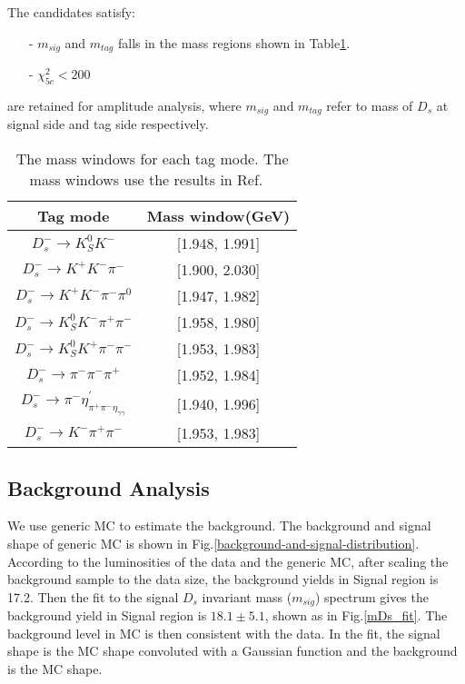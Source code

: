 {The candidates satisfy:
\begin{itemize}
    \item[-] $m_{sig}$ and $m_{tag}$ falls in the mass regions shown in Table\ref{ST-mass-window}. 
	\item[-] $\chi_{5c}^{2} < 200 $
\end{itemize}
are retained for amplitude analysis, where $m_{sig}$ and $m_{tag}$ refer to mass of $D_{s}$ at signal side and tag side respectively.
\begin{table}
    \caption{ The mass windows for each tag mode. The mass windows use the results in Ref. ~\cite{Doc-DB-630-v35} }
    \label{ST-mass-window}
    \begin{center}
        \begin{tabular}{cc}
            \toprule\toprule
            Tag mode & Mass window(GeV)  \\
            \hline
            $D_{s}^{-} \rightarrow K_{S}^{0}K^{-}$                          & [1.948, 1.991]    \\
            $D_{s}^{-} \rightarrow K^{+}K^{-}\pi^{-}$                       & [1.900, 2.030]    \\
            $D_{s}^{-} \rightarrow K^{+}K^{-}\pi^{-}\pi^{0}$                & [1.947, 1.982]    \\
            $D_{s}^{-} \rightarrow K_{S}^{0}K^{-}\pi^{+}\pi^{-}$            & [1.958, 1.980]    \\
            $D_{s}^{-} \rightarrow K_{S}^{0}K^{+}\pi^{-}\pi^{-}$            & [1.953, 1.983]    \\
            $D_{s}^{-} \rightarrow \pi^{-}\pi^{-}\pi^{+}$                   & [1.952, 1.984]    \\
            $D_{s}^{-} \rightarrow \pi^{-}\eta_{\pi^{+}\pi^{-}\eta_{\gamma\gamma}}^{'}$  & [1.940, 1.996]        \\
            $D_{s}^{-} \rightarrow K^{-}\pi^{+}\pi^{-}$                     & [1.953, 1.983]    \\
            \bottomrule\bottomrule
        \end{tabular}
    \end{center}
\end{table}

}

\subsection{Background Analysis}
We use generic MC to estimate the background. The background and signal shape of generic MC is shown in Fig.\ref{background-and-signal-distribution}. 
According to the luminosities of the data and the generic MC, after scaling the background sample to the data size, the background yields in Signal region is 17.2. 
Then the fit to the signal $D_{s}$ invariant mass ($m_{sig}$) spectrum gives the background yield in Signal region is $18.1 \pm 5.1$, shown as in Fig.\ref{mDs_fit}.  
The background level in MC is then consistent with the data. In the fit, the signal shape is the MC shape convoluted with a Gaussian function and the background is the MC shape. 

